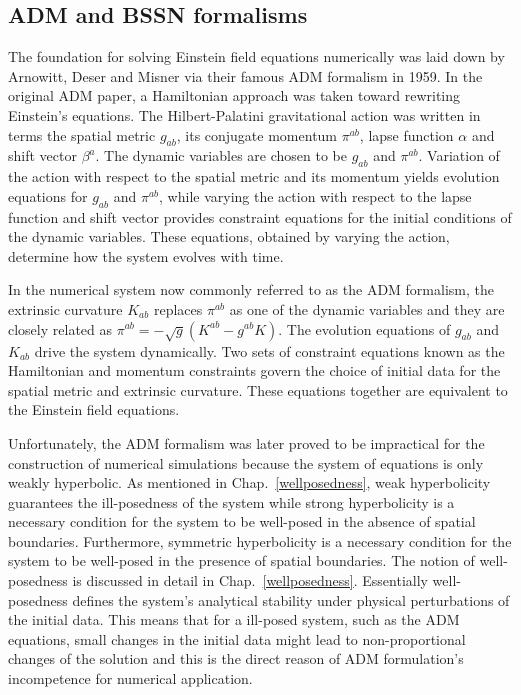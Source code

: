 \subsection{ADM and BSSN formalisms}
The foundation for solving Einstein field equations numerically was laid down by Arnowitt, Deser and Misner via their famous ADM formalism\cite{ADM:Witten} in 1959. In the original ADM paper, a Hamiltonian approach was taken toward rewriting Einstein's equations. The Hilbert-Palatini gravitational action was written in terms the spatial metric $g_{ab}$, its conjugate momentum $\pi^{ab}$, lapse function $\alpha$ and shift vector $\beta^{a}$. The dynamic variables are chosen to be $g_{ab}$ and $\pi^{ab}$. Variation of the action with respect to the spatial metric and its momentum yields evolution equations for $g_{ab}$ and $\pi^{ab}$, while varying the action with respect to the lapse function and shift vector provides constraint equations for the initial conditions of the dynamic variables. These equations, obtained by varying the action, determine how the system evolves with time. 

In the numerical system now commonly referred to as the ADM formalism\cite{Smarr:York,Smarr:1977uf}, the extrinsic curvature $K_{ab}$ replaces $\pi^{ab}$ as one of the dynamic variables and they are closely related as $\pi^{ab} = -\sqrt{g}(K^{ab} - g^{ab}K)$. The evolution equations of $g_{ab}$ and $K_{ab}$ drive the system dynamically. Two sets of constraint equations known as the Hamiltonian and momentum constraints govern the choice of initial data for the spatial metric and extrinsic curvature. These equations together are equivalent to the Einstein field equations. 

Unfortunately, the ADM formalism was later proved to be impractical for the construction of numerical simulations because the system of equations is only weakly hyperbolic. As mentioned in Chap.~\ref{wellposedness}, weak hyperbolicity guarantees the ill-posedness of the system while strong hyperbolicity is a necessary condition for the system to be well-posed in the absence of spatial boundaries. Furthermore, symmetric hyperbolicity is a necessary condition for the system to be well-posed in the presence of spatial boundaries. The notion of well-posedness is discussed in detail in Chap.~\ref{wellposedness}. Essentially well-posedness defines the system's analytical stability under physical perturbations of the initial data. This means that for a ill-posed system, such as the ADM equations, small changes in the initial data might lead to non-proportional changes of the solution and this is the direct reason of ADM formulation's incompetence for numerical application. 

